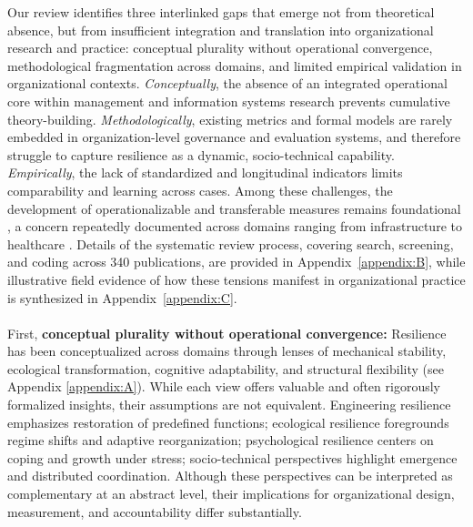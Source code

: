 Our review identifies three interlinked gaps that emerge not from theoretical absence, but from insufficient integration and translation into organizational research and practice: conceptual plurality without operational convergence, methodological fragmentation across domains, and limited empirical validation in organizational contexts. {\it Conceptually}, the absence of an integrated operational core within management and information systems research prevents cumulative theory-building. {\it Methodologically}, existing metrics and formal models are rarely embedded in organization-level governance and evaluation systems, and therefore struggle to capture resilience as a dynamic, socio-technical capability. {\it Empirically}, the lack of standardized and longitudinal indicators limits comparability and learning across cases. Among these challenges, the development of operationalizable and transferable measures remains foundational \autocite{woods2015four}, a concern repeatedly documented across domains ranging from infrastructure to healthcare \autocite{heinimann2017infrastructure, kruk2017building}. Details of the systematic review process, covering search, screening, and coding across 340 publications, are provided in Appendix~\ref{appendix:B}, while illustrative field evidence of how these tensions manifest in organizational practice is synthesized in Appendix~\ref{appendix:C}.\\
\\
First, {\bf conceptual plurality without operational convergence:} Resilience has been conceptualized across domains through lenses of mechanical stability, ecological transformation, cognitive adaptability, and structural flexibility (see Appendix \ref{appendix:A}). While each view offers valuable and often rigorously formalized insights, their assumptions are not equivalent. Engineering resilience emphasizes restoration of predefined functions; ecological resilience foregrounds regime shifts and adaptive reorganization; psychological resilience centers on coping and growth under stress; socio-technical perspectives highlight emergence and distributed coordination. Although these perspectives can be interpreted as complementary at an abstract level, their implications for organizational design, measurement, and accountability differ substantially.\\

